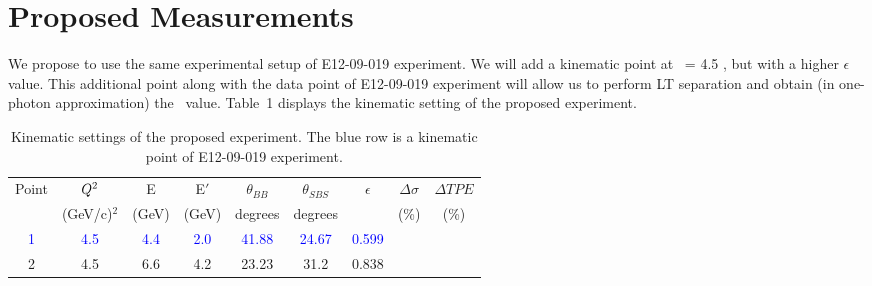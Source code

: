 \section{Proposed Measurements} 
%

We propose to use the same experimental setup of E12-09-019 experiment. 
We will add a kinematic point at \qsq~= 4.5 \gevcsq, but with a higher $\epsilon$ value. 
This additional point along with the data point of E12-09-019 experiment will allow us to perform LT separation and 
obtain (in one-photon approximation) the \gen~value. 
Table~1 displays the kinematic setting of the proposed experiment. 
\begin{center}
\begin{table}[h]
\begin{tabular}{|c|c|c|c|c|c|c|c|c|}
\hline
\small{Point} & $Q\textsuperscript{2}$  & E & E$'$  & $\theta_{BB}$ & $\theta_{SBS}$ & $\epsilon$ &$\Delta \sigma$ & $\Delta TPE$\\
& (GeV/c)$^2$ & (GeV) & (GeV)  & degrees & degrees   &  & (\%)& (\%) \\
\hline
\textcolor{blue}
 1&\textcolor{blue} {4.5} & \textcolor{blue}{4.4} & \textcolor{blue}{2.0} & \textcolor{blue}{41.88}  & \textcolor{blue}{24.67} & \textcolor{blue}{0.599} & & \\
\hline
2 & 4.5  &  6.6  &  4.2  & 23.23  &  31.2  &  0.838 & & \\
\hline
\end{tabular} 
\caption{Kinematic settings of the proposed experiment. The blue row is a kinematic point of E12-09-019 experiment.}
\label{tab:table1}
\end{table}
\end{center}
